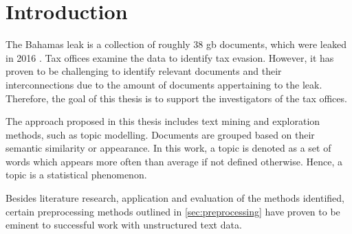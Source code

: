 \chapter{Introduction}\label{ch:introduction}

The Bahamas leak is a collection of roughly 38 \ac{gb} documents, which were leaked in 2016 \cite{data-corpus-bahamas-leaks}.
Tax offices examine the data to identify tax evasion.
However, it has proven to be challenging to identify relevant documents and their interconnections due to the amount of documents appertaining to the leak.
Therefore, the goal of this thesis is to support the investigators of the tax offices.

The approach proposed in this thesis includes text mining and exploration methods, such as topic modelling.
Documents are grouped based on their semantic similarity or appearance.
In this work, a topic is denoted as a set of words which appears more often than average if not defined otherwise.
Hence, a topic is a statistical phenomenon.

Besides literature research, application and evaluation of the methods identified, 
certain preprocessing methods outlined in \autoref{sec:preprocessing} have proven to be eminent to successful work with unstructured text data.